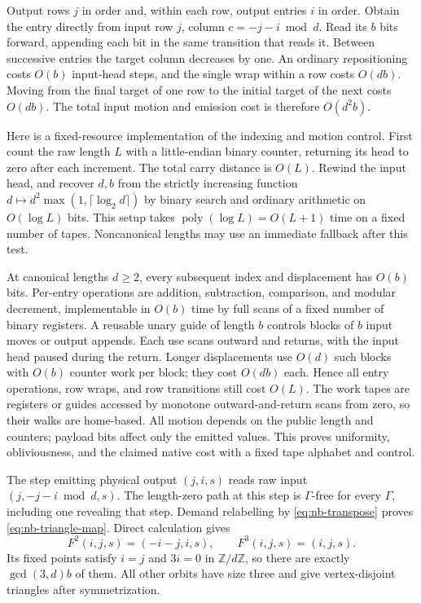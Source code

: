 \begin{informalproof}
Output rows $j$ in order and, within each row, output entries $i$ in
order.  Obtain the entry directly from input row $j$, column
$c=-j-i\bmod d$.  Read its $b$ bits forward, appending each bit in the
same transition that reads it.  Between successive entries the target
column decreases by one.  An ordinary repositioning costs $O(b)$
input-head steps, and the single wrap within a row costs $O(db)$.
Moving from the final target of one row to the initial target of the
next costs $O(db)$.  The total input motion and emission cost is
therefore $O(d^2b)$.

Here is a fixed-resource implementation of the indexing and motion
control.  First count the raw length $L$ with a little-endian binary
counter, returning its head to zero after each increment.  The total
carry distance is $O(L)$.  Rewind the input head, and recover $d,b$
from the strictly increasing function
$d\mapsto d^2\max(1,\lceil\log_2d\rceil)$ by binary search and
ordinary arithmetic on $O(\log L)$ bits.  This setup takes
$\operatorname{poly}(\log L)=O(L+1)$ time on a fixed number of tapes.
Noncanonical lengths may use an immediate fallback after this test.

At canonical lengths $d\ge2$, every subsequent index and displacement
has $O(b)$ bits.  Per-entry operations are addition, subtraction,
comparison, and modular decrement, implementable in $O(b)$ time by
full scans of a fixed number of binary registers.  A reusable unary
guide of length $b$ controls blocks of $b$ input moves or output
appends.  Each use scans outward and returns, with the input head
paused during the return.  Longer displacements use $O(d)$ such
blocks with $O(b)$ counter work per block; they cost $O(db)$ each.
Hence all entry operations, row wraps, and row transitions still cost
$O(L)$.  The work tapes are registers or guides accessed by monotone
outward-and-return scans from zero, so their walks are home-based.
All motion depends on the public length and counters; payload bits
affect only the emitted values.  This proves uniformity, obliviousness,
and the claimed native cost with a fixed tape alphabet and control.

The step emitting physical output $(j,i,s)$ reads raw input
$(j,-j-i\bmod d,s)$.  The length-zero path at this step is
$\Gamma$-free for every $\Gamma$, including one revealing that step.
Demand relabelling by \eqref{eq:nb-transpose} proves
\eqref{eq:nb-triangle-map}.  Direct calculation gives
\[
 F^2(i,j,s)=(-i-j,i,s),\qquad F^3(i,j,s)=(i,j,s).
\]
Its fixed points satisfy $i=j$ and $3i=0$ in $\mathbb Z/d\mathbb Z$,
so there are exactly $\gcd(3,d)b$ of them.  All other orbits have size
three and give vertex-disjoint triangles after symmetrization.


\end{informalproof}
